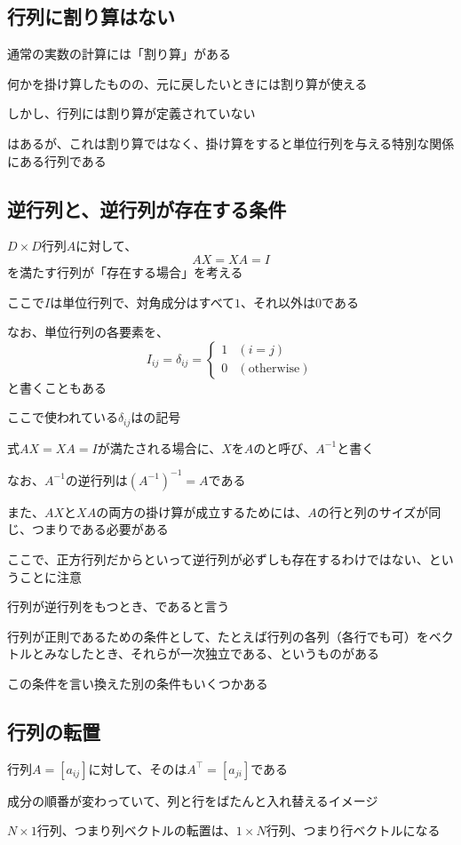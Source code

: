 \documentclass[../book_half_step_linear]{subfiles}
\begin{document}
\sectionline
\subsection{行列に割り算はない}

通常の実数の計算には「割り算」がある

何かを掛け算したものの、元に戻したいときには割り算が使える

\br

しかし、行列には割り算が定義されていない

はあるが、これは割り算ではなく、掛け算をすると単位行列を与える特別な関係にある行列である

\sectionline
\subsection{逆行列と、逆行列が存在する条件}

$D\times D$行列$A$に対して、
\begin{equation*}
  AX = XA = I
\end{equation*}
を満たす行列が「存在する場合」を考える

\br

ここで$I$は単位行列で、対角成分はすべて$1$、それ以外は$0$である

なお、単位行列の各要素を、
\begin{equation*}
  I_{ij} = \delta_{ij} = \begin{cases}
    1 & (i=j)              \\
    0 & (\text{otherwise})
  \end{cases}
\end{equation*}
と書くこともある

ここで使われている$\delta_{ij}$はの記号

\br

式$AX = XA = I$が満たされる場合に、$X$を$A$のと呼び、$A^{-1}$と書く

なお、$A^{-1}$の逆行列は$\left( A^{-1} \right)^{-1} = A$である

\br

また、$AX$と$XA$の両方の掛け算が成立するためには、$A$の行と列のサイズが同じ、つまりである必要がある

\br

ここで、正方行列だからといって逆行列が必ずしも存在するわけではない、ということに注意

行列が逆行列をもつとき、であると言う

\br

行列が正則であるための条件として、たとえば行列の各列（各行でも可）をベクトルとみなしたとき、それらが一次独立である、というものがある

この条件を言い換えた別の条件もいくつかある

\sectionline
\subsection{行列の転置}

行列$A=[a_{ij}]$に対して、そのは$A^\top=[a_{ji}]$である

成分の順番が変わっていて、列と行をばたんと入れ替えるイメージ

\br

$N\times 1$行列、つまり列ベクトルの転置は、$1\times N$行列、つまり行ベクトルになる
\end{document}
